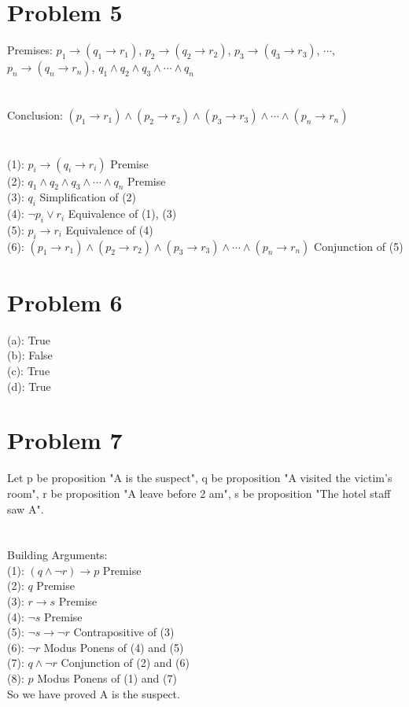 \documentclass{article}
\begin{document}
\section{Problem 5}
Premises: $p_1 \rightarrow (q_1 \rightarrow r_1)$, $p_2 \rightarrow (q_2 \rightarrow r_2)$, $p_3 \rightarrow (q_3 \rightarrow r_3)$, $\cdots$, $p_n \rightarrow (q_n \rightarrow r_n)$, $q_1 \wedge q_2 \wedge q_3 \wedge \cdots \wedge q_n$\\
\\ \hspace*{\fill} \\
Conclusion: $(p_1 \rightarrow r_1) \wedge (p_2 \rightarrow r_2) \wedge (p_3 \rightarrow r_3) \wedge \cdots \wedge (p_n \rightarrow r_n)$\\
\\ \hspace*{\fill} \\
(1): $p_i \rightarrow (q_i \rightarrow r_i)$ Premise\\
(2): $q_1 \wedge q_2 \wedge q_3 \wedge \cdots \wedge q_n$ Premise\\
(3): $q_i$ Simplification of (2)\\
(4): $\neg p_i \vee r_i$ Equivalence of (1), (3)\\
(5): $p_i \rightarrow r_i$ Equivalence of (4)\\
(6): $(p_1 \rightarrow r_1) \wedge (p_2 \rightarrow r_2) \wedge (p_3 \rightarrow r_3) \wedge \cdots \wedge (p_n \rightarrow r_n)$ Conjunction of (5)\\
\section{Problem 6}
(a): True\\
(b): False\\
(c): True\\
(d): True\\
\section{Problem 7}
Let p be proposition "A is the suspect", q be proposition "A visited the victim's room", r be proposition "A leave before 2 am", s be proposition "The hotel staff saw A".\\
\\ \hspace*{\fill} \\
Building Arguments:\\
(1): $(q \wedge \neg r) \rightarrow p$ Premise\\
(2): $q$ Premise\\
(3): $r \rightarrow s$ Premise\\
(4): $\neg s$ Premise\\
(5): $\neg s \rightarrow \neg r$ Contrapositive of (3)\\
(6): $\neg r$ Modus Ponens of (4) and (5)\\
(7): $q \wedge \neg r$ Conjunction of (2) and (6)\\
(8): $p$ Modus Ponens of (1) and (7)\\
So we have proved A is the suspect.\\
\end{document}
